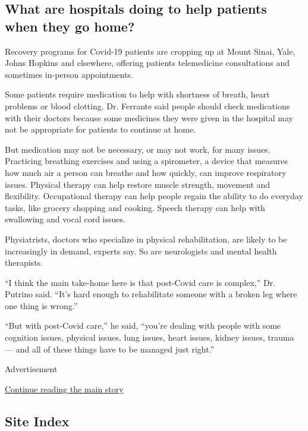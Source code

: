 \hypertarget{what-are-hospitals-doing-to-help-patients-when-they-go-home}{%
\subsection{What are hospitals doing to help patients when they go
home?}\label{what-are-hospitals-doing-to-help-patients-when-they-go-home}}

Recovery programs for Covid-19 patients are cropping up at Mount Sinai,
Yale, Johns Hopkins and elsewhere, offering patients telemedicine
consultations and sometimes in-person appointments.

Some patients require medication to help with shortness of breath, heart
problems or blood clotting. Dr. Ferrante said people should check
medications with their doctors because some medicines they were given in
the hospital may not be appropriate for patients to continue at home.

But medication may not be necessary, or may not work, for many issues.
Practicing breathing exercises and using a spirometer, a device that
measures how much air a person can breathe and how quickly, can improve
respiratory issues. Physical therapy can help restore muscle strength,
movement and flexibility. Occupational therapy can help people regain
the ability to do everyday tasks, like grocery shopping and cooking.
Speech therapy can help with swallowing and vocal cord issues.

Physiatrists, doctors who specialize in physical rehabilitation, are
likely to be increasingly in demand, experts say. So are neurologists
and mental health therapists.

``I think the main take-home here is that post-Covid care is complex,''
Dr. Putrino said. ``It's hard enough to rehabilitate someone with a
broken leg where one thing is wrong.''

``But with post-Covid care,'' he said, ``you're dealing with people with
some cognition issues, physical issues, lung issues, heart issues,
kidney issues, trauma --- and all of these things have to be managed
just right.''

Advertisement

\protect\hyperlink{after-bottom}{Continue reading the main story}

\hypertarget{site-index}{%
\subsection{Site Index}\label{site-index}}

